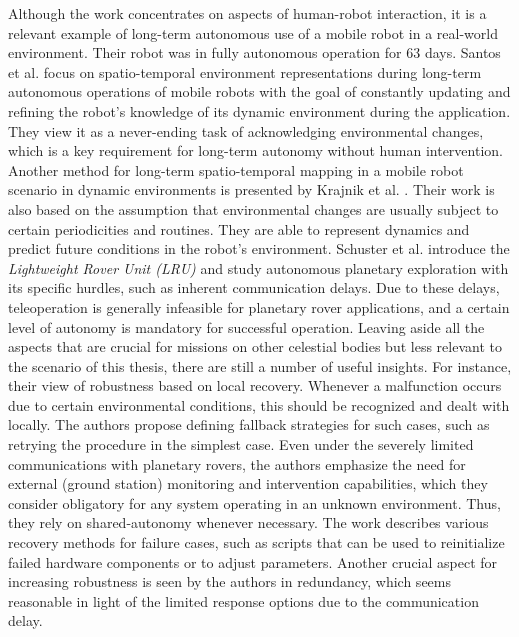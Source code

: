 \documentclass[english, master, utf8]{base/thesis_KBS}
\begin{document}
Although the work concentrates on aspects of human-robot interaction, it is a relevant example of long-term autonomous use of a mobile robot in a real-world environment.
Their robot was in fully autonomous operation for $63$ days.\newline
Santos et al. \cite{Santos:2017} focus on spatio-temporal environment representations during long-term autonomous operations of mobile robots with the goal of constantly updating
and refining the robot's knowledge of its dynamic environment during the application. They view it as a never-ending task of acknowledging environmental changes, which is a key
requirement for long-term autonomy without human intervention. \cite{Santos:2017}
Another method for long-term spatio-temporal mapping in a mobile robot scenario in dynamic environments is presented by Krajnik et al. \cite{Krajnik:2017}. Their work is also
based on the assumption that environmental changes are usually subject to certain periodicities and routines. They are able to represent dynamics and predict future conditions
in the robot's environment.\newline
Schuster et al. \cite{Schuster:2017} introduce the \textit{Lightweight Rover Unit (LRU)} and study autonomous planetary exploration with its specific hurdles, such as
inherent communication delays. Due to these delays, teleoperation is generally infeasible for planetary rover applications, and a certain level of autonomy is mandatory for successful
operation. \cite{Schuster:2017} Leaving aside all the aspects that are crucial for missions on other celestial bodies but less relevant to the scenario of this thesis, there are
still a number of useful insights. For instance, their view of robustness based on local recovery. Whenever a malfunction occurs due to certain environmental conditions, this should
be recognized and dealt with locally. \cite{Schuster:2017} The authors propose defining fallback strategies for such cases, such as retrying the procedure in the simplest case. Even
under the severely limited communications with planetary rovers, the authors emphasize the need for external (ground station) monitoring and intervention capabilities, which they
consider obligatory for any system operating in an unknown environment. Thus, they rely on shared-autonomy whenever necessary. The work describes various recovery methods for failure
cases, such as scripts that can be used to reinitialize failed hardware components or to adjust parameters. Another crucial aspect for increasing robustness is seen by the authors
in redundancy, which seems reasonable in light of the limited response options due to the communication delay.\newline
\end{document}
